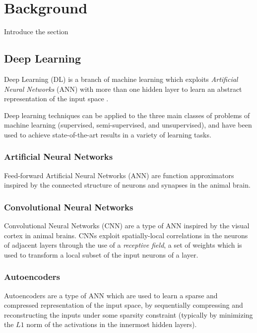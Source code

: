 \chapter{Background}
\label{ch1_intro}
\thispagestyle{empty}

\vspace{0.5cm}

\noindent Introduce the section

\section{Deep Learning}
Deep Learning (DL) is a branch of machine learning which exploits \textit{Artificial 
Neural Networks} (ANN) with more than one hidden layer to learn an abstract 
representation of the input space \cite{lecun2015deep}. 

Deep learning techniques can be applied to the three main classes of problems 
of machine learning (supervised, semi-supervised, and unsupervised), and have 
been used to achieve state-of-the-art results in a variety of learning tasks.

\subsection{Artificial Neural Networks}
Feed-forward Artificial Neural Networks (ANN) are function approximators 
inspired by the connected structure of neurons and synapses in the animal brain.

\subsection{Convolutional Neural Networks}
Convolutional Neural Networks (CNN) are a type of ANN inspired by the visual 
cortex in animal brains.
CNNs exploit spatially-local correlations in the neurons of adjacent 
layers through the use of a \textit{receptive field}, a set of weights which is 
used to transform a local subset of the input neurons of a layer.


\subsection{Autoencoders}
Autoencoders are a type of ANN which are used to learn a sparse and compressed 
representation of the input space, by sequentially compressing and 
reconstructing the inputs under some sparsity constraint (typically by 
minimizing the $L1$ norm of the activations in the innermost hidden layers).


